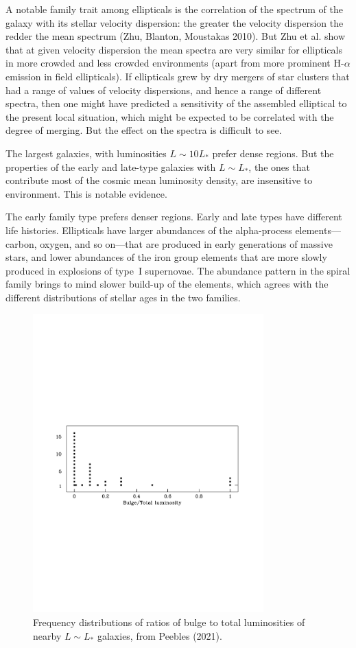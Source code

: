 \documentclass[fleqn,usenatbib]{mnras}
\begin{document}
A notable family trait among ellipticals is the correlation of the spectrum of the galaxy with its stellar velocity dispersion: the greater the velocity dispersion the redder the mean spectrum (Zhu, Blanton, Moustakas 2010). But Zhu et al. show that at given velocity dispersion the mean spectra are very similar for ellipticals in more crowded and less crowded environments (apart from more  prominent H-$\alpha$ emission in field ellipticals). If ellipticals grew by dry mergers of star clusters that had a range of values of velocity dispersions, and hence a range of different spectra, then one might have predicted a sensitivity of the assembled elliptical to the present local situation, which might be expected to be correlated with the degree of merging. But the effect on the spectra is difficult to see.

The largest galaxies, with luminosities $L\sim 10L_\ast$ prefer dense regions. But the properties of the early and late-type galaxies with $L\sim L_\ast$, the ones that contribute most of the cosmic mean luminosity density, are insensitive to environment. This is notable evidence.

The early family type prefers denser regions. Early and late types have different life histories. Ellipticals have larger abundances of the alpha-process elements---carbon, oxygen, and so on---that are produced in early generations of massive stars, and lower abundances of the iron group elements that are more slowly produced in explosions of type~I supernovae. The abundance pattern in the spiral family brings to mind slower build-up of the elements, which agrees with the different distributions of stellar ages in the two families. 

\begin{figure}
\begin{center}
\includegraphics[angle=0,width=3.5in]{BtoT.pdf}
\caption{\small Frequency distributions of ratios of bulge to total luminosities of nearby $L\sim L_\ast$ galaxies, from Peebles (2021).}\label{fig:BtoT}
\end{center}
\end{figure}
\end{document}
